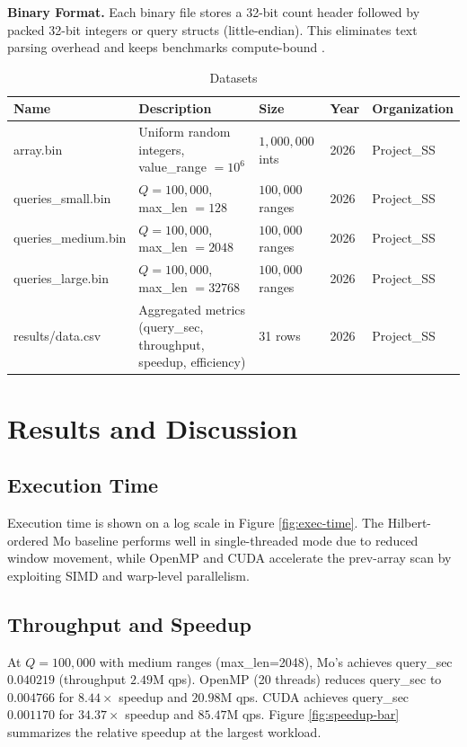 \documentclass[12pt,a4paper]{article}
\begin{document}
   \textbf{Binary Format.} Each binary file stores a 32-bit count header followed by packed 32-bit integers or query structs (little-endian). This eliminates text parsing overhead and keeps benchmarks compute-bound \cite{lemire2019parsing}.
   
   \begin{longtable}[htp]{|p{3cm}|p{7cm}|p{2.2cm}|p{1.2cm}|p{2.6cm}|}
	\caption{Datasets}
	\label{Table2}
	\hline \textbf {Name} & \textbf{Description} & \textbf{Size} & \textbf{Year} & \textbf{Organization} \\
	\hline array.bin & Uniform random integers, value\_range $=10^6$ & $1{,}000{,}000$ ints & 2026 & Project\_SS \\
	\hline queries\_small.bin & $Q=100{,}000$, max\_len $=128$ & $100{,}000$ ranges & 2026 & Project\_SS \\
	\hline queries\_medium.bin & $Q=100{,}000$, max\_len $=2048$ & $100{,}000$ ranges & 2026 & Project\_SS \\
	\hline queries\_large.bin & $Q=100{,}000$, max\_len $=32768$ & $100{,}000$ ranges & 2026 & Project\_SS \\
	\hline results/data.csv & Aggregated metrics (query\_sec, throughput, speedup, efficiency) & 31 rows & 2026 & Project\_SS \\
	\hline
	\end{longtable}
   \newpage
   \section{Results and Discussion}
   \subsection{Execution Time}
   Execution time is shown on a log scale in Figure \ref{fig:exec-time}. The Hilbert-ordered Mo baseline performs well in single-threaded mode due to reduced window movement, while OpenMP and CUDA accelerate the prev-array scan by exploiting SIMD and warp-level parallelism.
   
   \subsection{Throughput and Speedup}
   At $Q=100{,}000$ with medium ranges (max\_len=2048), Mo's achieves query\_sec $0.040219$ (throughput $2.49$M qps). OpenMP (20 threads) reduces query\_sec to $0.004766$ for $8.44\times$ speedup and $20.98$M qps. CUDA achieves query\_sec $0.001170$ for $34.37\times$ speedup and $85.47$M qps. Figure \ref{fig:speedup-bar} summarizes the relative speedup at the largest workload.
   
\end{document}
